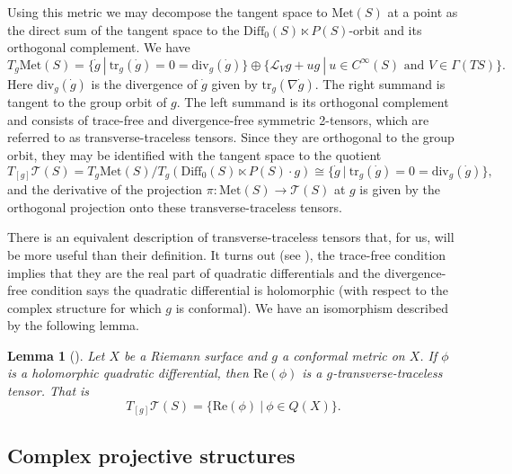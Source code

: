 \documentclass{amsart}
\newtheorem{lem}[thm]{Lemma}
\begin{document}
Using this metric we may decompose the tangent space to $\mathrm{Met}(S)$ at a point as the direct sum of the tangent space to the $\mathrm{Diff}_0(S) \ltimes P(S)$-orbit and its orthogonal complement. 
We have
\[
T_g \mathrm{Met}(S) = \{ \dot{g} \ | \ \mathrm{tr}_g(\dot{g}) = 0 = \mathrm{div}_g(\dot{g})\} \oplus \{ \mathcal{L}_V g + ug \ | \ u \in C^\infty(S) \text{ and } V \in \Gamma(TS) \}.
\]
Here $\mathrm{div}_g(\dot{g})$ is the divergence of $\dot{g}$ given by $\mathrm{tr}_g(\nabla \dot{g})$. 
The right summand is tangent to the group orbit of $g$. 
The left summand is its orthogonal complement and consists of trace-free and divergence-free symmetric 2-tensors, which are referred to as transverse-traceless tensors. 
Since they are orthogonal to the group orbit, they may be identified with the tangent space to the quotient
\[
T_{[g]} \mathcal{T}(S) = T_g \mathrm{Met}(S)/T_g(\mathrm{Diff}_0(S) \ltimes P(S) \cdot g) \cong \{ \dot{g} \ | \ \mathrm{tr}_g(\dot{g}) = 0 = \mathrm{div}_g(\dot{g})\},
\]
and the derivative of the projection $\pi: \mathrm{Met}(S) \to \mathcal{T}(S)$ at $g$ is given by the orthogonal projection onto these transverse-traceless tensors. 

There is an equivalent description of transverse-traceless tensors that, for us, will be more useful than their definition. 
It turns out (see \cite{tromba1992}), the trace-free condition implies that they are the real part of quadratic differentials and the divergence-free condition says the quadratic differential is holomorphic (with respect to the complex structure for which $g$ is conformal). 
We have an isomorphism described by the following lemma.

\begin{lem}[\cite{tromba1992}] \label{tangent-teich}
Let $X$ be a Riemann surface and $g$ a conformal metric on $X$. 
If $\phi$ is a holomorphic quadratic differential, then $\mathrm{Re}(\phi)$ is a $g$-transverse-traceless tensor. 
That is 
\[
T_{[g]}\mathcal{T}(S) = \{\mathrm{Re}(\phi) \ | \ \phi \in Q(X) \}.
\]
\end{lem}



\subsection{Complex projective structures}
\end{document}
